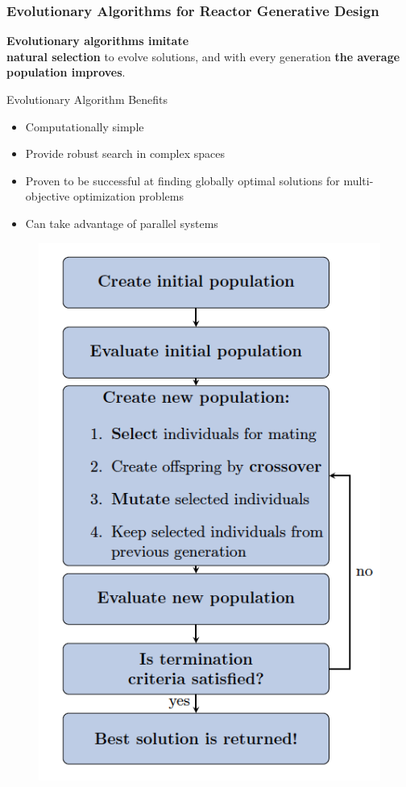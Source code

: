    \begin{frame}
    \frametitle{Evolutionary Algorithms for Reactor Generative Design}
    \begin{minipage}{0.49\textwidth}
        \textbf{Evolutionary algorithms imitate \\ natural selection} to evolve solutions,  
        and with every generation \textbf{the average population improves}. 

        \vspace{0.3cm}
        Evolutionary Algorithm Benefits 
        \begin{itemize}
            \item Computationally simple
            \item Provide robust search in complex spaces
            \item Proven to be successful at finding globally optimal solutions for 
            multi-objective optimization problems 
            \item Can take advantage of parallel systems 
        \end{itemize}
        \end{minipage}
    \begin{minipage}[c]{0.49\textwidth}
        \begin{figure}
            \includegraphics[width=0.8\linewidth]{figures/ea-flow.png} 
          \end{figure}
    \end{minipage}
    \end{frame}

